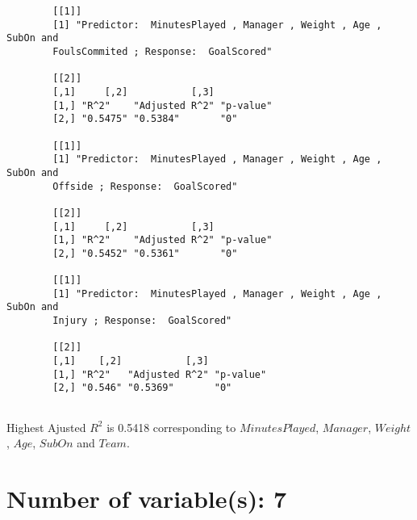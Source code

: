 \documentclass[12pt]{article}
\begin{document}
\begin{verbatim}
		[[1]]
		[1] "Predictor:  MinutesPlayed , Manager , Weight , Age , SubOn and 
		FoulsCommited ; Response:  GoalScored"
		
		[[2]]
		[,1]     [,2]           [,3]     
		[1,] "R^2"    "Adjusted R^2" "p-value"
		[2,] "0.5475" "0.5384"       "0"      
		
		[[1]]
		[1] "Predictor:  MinutesPlayed , Manager , Weight , Age , SubOn and 
		Offside ; Response:  GoalScored"
		
		[[2]]
		[,1]     [,2]           [,3]     
		[1,] "R^2"    "Adjusted R^2" "p-value"
		[2,] "0.5452" "0.5361"       "0"      
		
		[[1]]
		[1] "Predictor:  MinutesPlayed , Manager , Weight , Age , SubOn and 
		Injury ; Response:  GoalScored"
		
		[[2]]
		[,1]    [,2]           [,3]     
		[1,] "R^2"   "Adjusted R^2" "p-value"
		[2,] "0.546" "0.5369"       "0"      
		
	\end{verbatim}
	
		Highest Ajusted $ R^2 $ is 0.5418 corresponding to $ MinutesPlayed $, $ Manager $, $ Weight $, $ Age $, $ SubOn $ and $ Team $.
	
	\section{Number of variable(s): 7}
	
\end{document}
